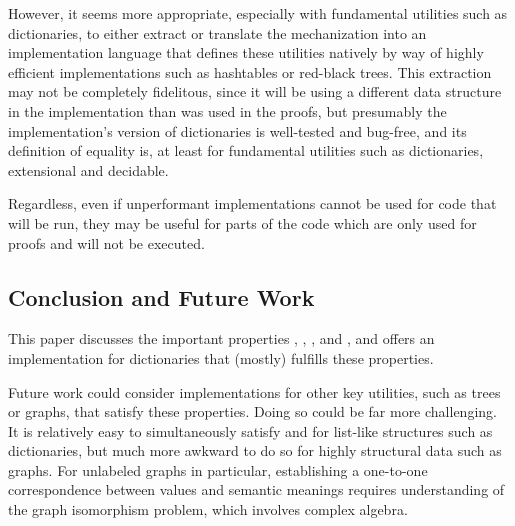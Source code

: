 However, it seems more appropriate, especially with
%
fundamental utilities such as dictionaries, to either extract or translate the mechanization into an implementation language that defines these utilities natively
%
by way of highly efficient implementations such as hashtables or red-black trees. This extraction may not be completely fidelitous, since it will be using a
%
different data structure in the implementation than was used in the proofs, but presumably the implementation's version of dictionaries is well-tested and bug-free,
%
and its definition of equality is, at least for fundamental utilities such as dictionaries, extensional and decidable.

Regardless, even if unperformant implementations
%
cannot be used for code that will be run, they may be useful for parts of the code which are only used for proofs and will not be executed.


\subsection{Conclusion and Future Work}
\label{sec:Discussion:Conclusion}
%
This paper discusses the important properties \SemTot, \SemInj, \EqDec, and \EzDstr, and offers an implementation for dictionaries that (mostly) fulfills these properties.

Future work could consider implementations for other key utilities, such as trees or graphs, that satisfy these properties.
%
Doing so could be far more challenging.
%
It is relatively easy to simultaneously satisfy \SemTot{} and \SemInj{} for list-like structures such as dictionaries,
%
but much more awkward to do so for highly structural data such as graphs. For unlabeled graphs in particular, establishing a one-to-one correspondence between values and
%
semantic meanings requires understanding of the graph isomorphism problem, which involves complex algebra.

